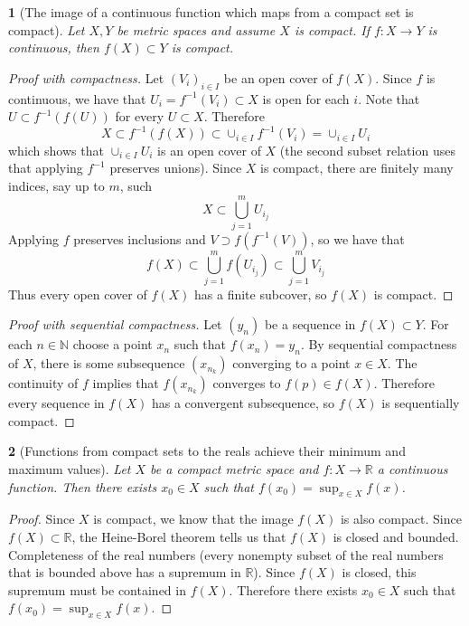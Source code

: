 \documentclass[11pt]{article}
\numberwithin{equation}{section}
\theoremstyle{plain}
\newtheorem{theorem}{\color{ForestGreen}{\textbf{Theorem}}}[section]
\theoremstyle{definition}
\newcommand\inv[1]{#1^{-1}}
\def\ss{\subset}
\newcommand{\1}{\mathbbm 1}
\newcommand{\RR}{\mathbb R}
\newcommand{\NN}{\mathbb N}
\begin{document}
\begin{theorem}[The image of a continuous function which maps from a compact set is compact]
	Let $X,Y$ be metric spaces and assume $X$ is compact. If $f: X \to Y$ is continuous, then $f(X) \subset Y$ is compact. 
\end{theorem}
\begin{proof}[Proof with compactness]
	Let $(V_i)_{i \in I}$ be an open cover of $f(X)$. Since $f$ is continuous, we have that $U_i = f^{-1}(V_i) \subset X$ is open for each $i$. Note that $U \ss \inv{f}(f(U))$ for every $U \subset X$. Therefore
	\begin{equation}
		X \ss \inv{f}(f(X)) \ss \cup_{i \in I} \inv{f}(V_{i}) = \cup_{i \in I} U_{i} 
	\end{equation}
	which shows that $\cup_{i \in I} U_{i}$ is an open cover of $X$ (the second subset relation uses that applying $f^{-1}$ preserves unions). Since $X$ is compact, there are finitely many indices, say up to $m$, such
	\begin{equation}
		X \ss \bigcup_{j=1}^m  U_{i_j}
	\end{equation}
	Applying $f$ preserves inclusions and $V \supset f(\inv{f}(V))$, so we have that
	\begin{equation}
		f(X) \ss \bigcup_{j=1}^m f(U_{i_j}) \ss \bigcup_{j=1}^m V_{i_j}
	\end{equation}
	Thus every open cover of $f(X)$ has a finite subcover, so $f(X)$ is compact. 
\end{proof}

\begin{proof}[Proof with sequential compactness]
	Let $(y_n)$ be a sequence in $f(X) \ss Y$. For each $n \in \NN$ choose a point $x_n$ such that $f(x_n) = y_n$. By sequential compactness of $X$, there is some subsequence $(x_{n_k})$ converging to a point $x \in X$. The continuity of $f$ implies that $f(x_{n_k})$ converges to $f(p) \in f(X)$. Therefore every sequence in $f(X)$ has a convergent subsequence, so $f(X)$ is sequentially compact.  
\end{proof}


\begin{theorem}[Functions from compact sets to the reals achieve their minimum and maximum values]
	Let $X$ be a compact metric space and $f:X \to \RR$ a continuous function. Then there exists $x_0 \in X$ such that $f(x_0) = \sup_{x\in X} f(x)$. 
\end{theorem}
\begin{proof}
	Since $X$ is compact, we know that the image $f(X)$ is also compact. Since $f(X) \ss \RR$, the Heine-Borel theorem tells us that $f(X)$ is closed and bounded. Completeness of the real numbers (every nonempty subset of the real numbers that is bounded above has a supremum in $\RR$). Since $f(X)$ is closed, this supremum must be contained in $f(X)$. Therefore there exists $x_0 \in X$ such that $f(x_0) = \sup_{x\in X} f(x)$. 
\end{proof}
\end{document}
